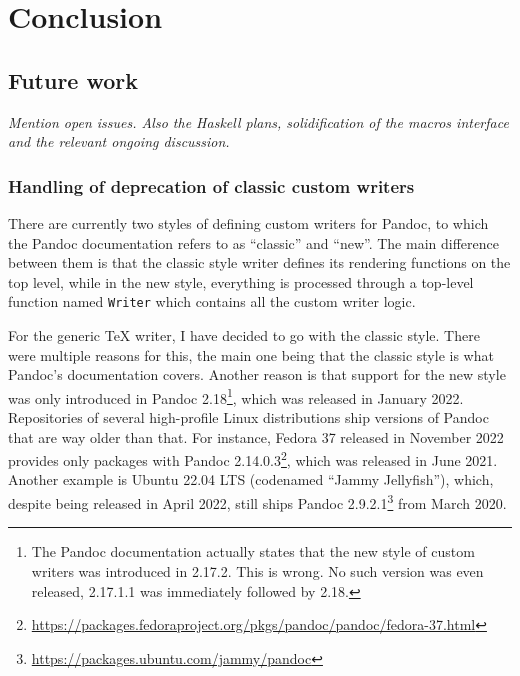 \documentclass[
  digital,     %
  oneside,     %
  nosansbold,  %
  nocolorbold, %
  lof,         %
  nolot,       %
]{fithesis4}
\begin{document}
% 


\chapter{Conclusion}
\section{Future work}
\emph{Mention open issues. Also the Haskell plans, solidification of the macros interface and the relevant ongoing discussion.}

\subsection{Handling of deprecation of classic custom writers}

There are currently two styles of defining custom writers for Pandoc, to which the Pandoc documentation refers to as ``classic'' and ``new''. The main difference between them is that the classic style writer defines its rendering functions on the top level, while in the new style, everything is processed through a top-level function named \texttt{Writer} which contains all the custom writer logic.

For the generic \TeX{} writer, I have decided to go with the classic style. There were multiple reasons for this, the main one being that the classic style is what Pandoc's documentation covers. Another reason is that support for the new style was only introduced in Pandoc 2.18\footnote{The Pandoc documentation actually states that the new style of custom writers was introduced in 2.17.2. This is wrong. No such version was even released, 2.17.1.1 was immediately followed by 2.18.}, which was released in January 2022. Repositories of several high-profile Linux distributions ship versions of Pandoc that are way older than that. For instance, Fedora 37 released in November 2022 provides only packages with Pandoc 2.14.0.3\footnote{\url{https://packages.fedoraproject.org/pkgs/pandoc/pandoc/fedora-37.html}}, which was released in June 2021. Another example is Ubuntu 22.04 LTS (codenamed ``Jammy Jellyfish''), which, despite being released in April 2022, still ships Pandoc 2.9.2.1\footnote{\url{https://packages.ubuntu.com/jammy/pandoc}} from March 2020.
\end{document}
